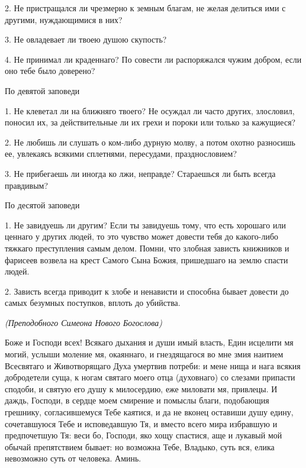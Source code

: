 2. Не пристращался ли чрезмерно к земным благам, не желая делиться ими с другими, нуждающимися в них?

3. Не овладевает ли твоею душою скупость?

4. Не принимал ли краденнаго? По совести ли распоряжался чужим добром, если оно тебе было доверено? 

\bfseries \itshape 

По девятой заповеди

\normalfont{}\normalfont{}1. Не клеветал ли на ближняго твоего? Не осуждал ли часто других, злословил, поносил их, за действительные ли их грехи и пороки или только за кажущиеся?

2. Не любишь ли слушать о ком-либо дурную молву, а потом охотно разносишь ее, увлекаясь всякими сплетнями, пересудами, празднословием?

3. Не прибегаешь ли иногда ко лжи, неправде? Стараешься ли быть всегда правдивым? 

\bfseries \itshape 

По десятой заповеди

\normalfont{}\normalfont{}1. Не завидуешь ли другим? Если ты завидуешь тому, что есть хорошаго или ценнаго у других людей, то это чувство может довести тебя до какого-либо тяжкаго преступления самым делом. Помни, что злобная зависть книжников и фарисеев возвела на крест Самого Сына Божия, пришедшаго на землю спасти людей.

2. Зависть всегда приводит к злобе и ненависти и способна бывает довести до самых безумных поступков, вплоть до убийства.





\mychapterending

 


\itshape (Преподобного Симеона Нового Богослова) 

\normalfont{}

Боже и Господи всех! Всякаго дыхания и души имый власть, Един исцелити мя могий, услыши моление мя, окаяннаго, и гнездящагося во мне змия наитием Всесвятаго и Животворящаго Духа умертвив потреби: и мене нища и нага всякия добродетели суща, к ногам святаго моего отца (духовнаго) со слезами припасти сподоби, и святую его душу к милосердию, еже миловати мя, привлецы. И даждь, Господи, в сердце моем смирение и помыслы благи, подобающия грешнику, согласившемуся Тебе каятися, и да не вконец оставиши душу едину, сочетавшуюся Тебе и исповедавшую Тя, и вместо всего мира избравшую и предпочетшую Тя: веси бо, Господи, яко хощу спастися, аще и лукавый мой обычай препятствием бывает: но возможна Тебе, Владыко, суть вся, елика невозможно суть от человека. Аминь. 


